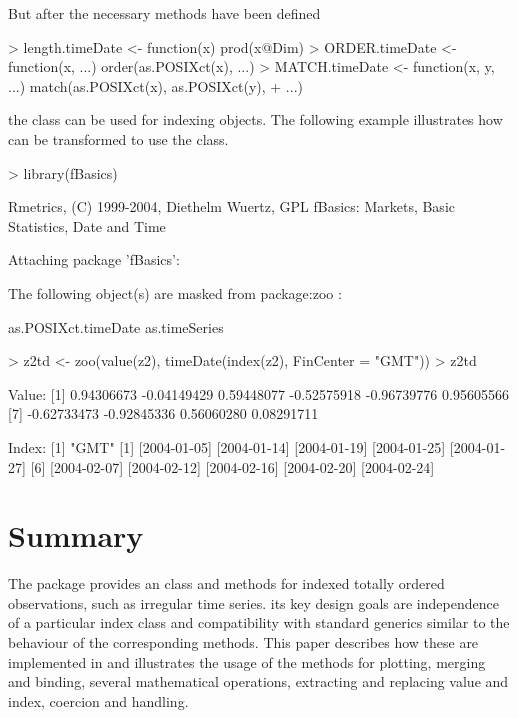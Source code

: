 \documentclass{Z}
\begin{document}
But after the necessary methods have been defined
\begin{Schunk}
\begin{Sinput}
> length.timeDate <- function(x) prod(x@Dim)
> ORDER.timeDate <- function(x, ...) order(as.POSIXct(x), ...)
> MATCH.timeDate <- function(x, y, ...) match(as.POSIXct(x), as.POSIXct(y), 
+     ...)
\end{Sinput}
\end{Schunk}
the class  can be used for indexing  objects.
The following example illustrates how  can be transformed
to use the  class.
\begin{Schunk}
\begin{Sinput}
> library(fBasics)
\end{Sinput}
\begin{Soutput}
Rmetrics, (C) 1999-2004, Diethelm Wuertz, GPL
fBasics: Markets, Basic Statistics, Date and Time

Attaching package 'fBasics':


	The following object(s) are masked from package:zoo :

	 as.POSIXct.timeDate as.timeSeries 
\end{Soutput}
\begin{Sinput}
> z2td <- zoo(value(z2), timeDate(index(z2), FinCenter = "GMT"))
> z2td
\end{Sinput}
\begin{Soutput}
Value:
 [1]  0.94306673 -0.04149429  0.59448077 -0.52575918 -0.96739776  0.95605566
 [7] -0.62733473 -0.92845336  0.56060280  0.08291711

Index:
[1] "GMT"
 [1] [2004-01-05] [2004-01-14] [2004-01-19] [2004-01-25] [2004-01-27]
 [6] [2004-02-07] [2004-02-12] [2004-02-16] [2004-02-20] [2004-02-24]
\end{Soutput}
\end{Schunk}

\section{Summary} \label{sec:summary}

The package  provides an  class and methods
for indexed totally ordered observations, such as irregular time series.
its key design goals are independence of a particular index class 
and compatibility with standard generics similar to the behaviour of 
the corresponding  methods. This paper describes how
these are implemented in  and illustrates the usage of 
the methods for plotting, merging and
binding, several mathematical operations, extracting and replacing value
and index, coercion and  handling.



\begin{appendix}

\end{appendix}
\end{document}
